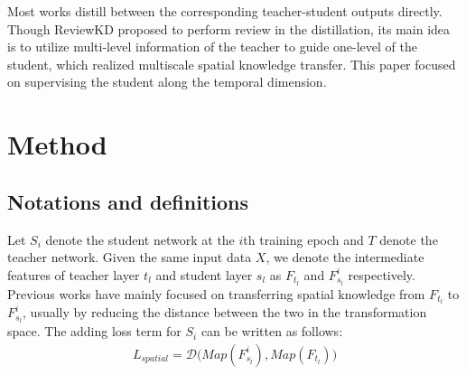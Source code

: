 \documentclass[letterpaper]{article} %
\begin{document}

Most works distill between the corresponding teacher-student outputs directly. Though ReviewKD \cite{chen2021distilling} proposed to perform review in the distillation, its main idea is to utilize multi-level information of the teacher to guide one-level of the student, which realized multiscale spatial knowledge transfer. This paper focused on supervising the student along the temporal dimension.

\section{Method}

\subsection{Notations and definitions}
Let $S_{i}$ denote the student network at the $i$th training epoch and $T$ denote the teacher network. Given the same input data $X$, we denote the intermediate features of teacher layer $t_{l}$ and student layer $s_{l}$ as $F_{t_{l}}$ and $F_{s_{l}}^{i}$ respectively.
Previous works have mainly focused on transferring spatial knowledge from $F_{t_{l}}$ to $F_{s_{l}}^{i}$, usually by reducing the distance between the two in the transformation space. The adding loss term for $S_{i}$ can be written as follows:
\begin{align}
	\label{eq:1}
	L_{spatial} = \mathcal{D}\Big(Map(F_{s_{l}}^{i}),Map(F_{t_{l}})\Big)
\end{align}
\end{document}
